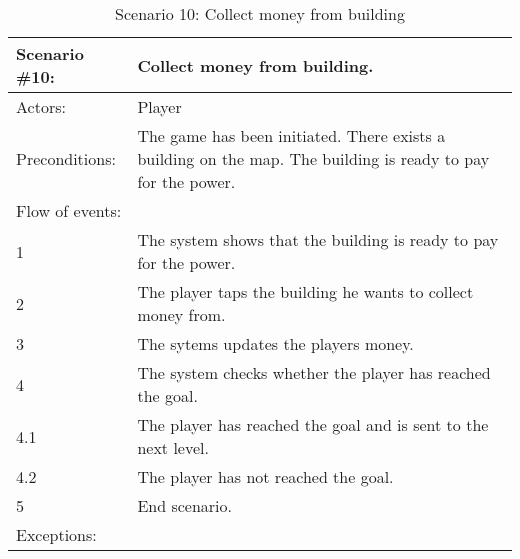 \begin{table}
	\begin{tabular}{| l | p{10cm} |}
		\hline
		\rowcolor{lightgray}
		{\bf Scenario \#10:} & {\bf Collect money from building.} \\ \hline
		Actors: & Player \\ \hline
		Preconditions: & The game has been initiated. There exists a building on the map. The building is ready to pay for the power. \\ \hline
		\rowcolor{lightergray}
		Flow of events: & \\ \hline
		1 & The system shows that the building is ready to pay for the power. \\ \hline
		2 & The player taps the building he wants to collect money from. \\ \hline
		3 & The sytems updates the players money. \\ \hline
		4 & The system checks whether the player has reached the goal. \\ \hline
		4.1 & The player has reached the goal and is sent to the next level. \\ \hline
		4.2 & The player has not reached the goal. \\ \hline
		5 & End scenario. \\ \hline
		\rowcolor{lightergray}
		Exceptions: & \\ \hline
	\end{tabular}
\caption{Scenario 10: Collect money from building}
\end{table}

